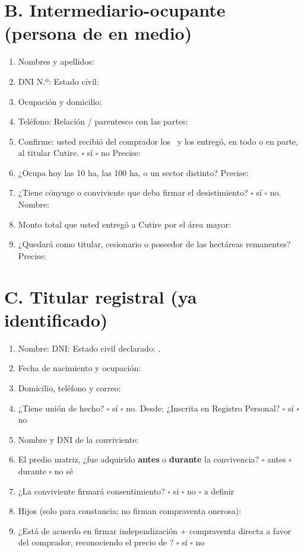 \documentclass[12pt,a4paper]{article}
\begin{document}
\section*{B. Intermediario-ocupante (persona de en medio)}
\begin{enumerate}[leftmargin=1.15cm]
\item Nombres y apellidos: \linea[11.5cm]
\item DNI N.º: \linea[4.5cm] Estado civil: \linea[5.8cm]
\item Ocupación y domicilio: \linea[11.2cm]
\item Teléfono: \linea[5.5cm] Relación / parentesco con las partes: \linea[4.2cm]
\item Confirme: usted recibió del comprador los \MontoPago\ y los entregó, en todo o en parte, al titular Cutire. \quad $\square$ sí \quad $\square$ no \quad Precise: \linea[4.8cm]
\item ¿Ocupa hoy las 10 ha, las 100 ha, o un sector distinto? Precise: \linea[7.6cm]
\item ¿Tiene cónyuge o conviviente que deba firmar el desistimiento? \quad $\square$ sí \quad $\square$ no. Nombre: \linea[5cm]
\item Monto total que usted entregó a Cutire por el área mayor: \linea[7.8cm]
\item ¿Quedará como titular, cesionario o poseedor de las hectáreas remanentes? Precise: \linea[6.4cm]
\end{enumerate}

\section*{C. Titular registral (ya identificado)}
\begin{enumerate}[leftmargin=1.15cm]
\item Nombre: \textbf{\VendedorNombreCompleto} \quad DNI: \textbf{\VendedorDNI} \quad Estado civil declarado: \textbf{\VendedorEstadoCivil}.
\item Fecha de nacimiento y ocupación: \linea[10.5cm]
\item Domicilio, teléfono y correo: \linea[10.8cm]
\item ¿Tiene unión de hecho? \quad $\square$ sí \quad $\square$ no. Desde: \linea[3.2cm] \quad ¿Inscrita en Registro Personal? \quad $\square$ sí \quad $\square$ no
\item Nombre y DNI de la conviviente: \linea[10.8cm]
\item El predio matriz, ¿fue adquirido \textbf{antes} o \textbf{durante} la convivencia? \quad $\square$ antes \quad $\square$ durante \quad $\square$ no sé
\item ¿La conviviente firmará consentimiento? \quad $\square$ sí \quad $\square$ no \quad $\square$ a definir
\item Hijos (solo para constancia; no firman compraventa onerosa): \linea[8.6cm]
\item ¿Está de acuerdo en firmar independización + compraventa directa a favor del comprador, reconociendo el precio de \MontoPago? \quad $\square$ sí \quad $\square$ no
\end{enumerate}
\end{document}
